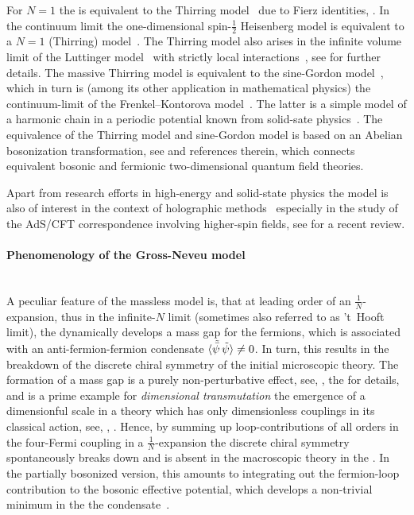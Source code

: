 For $N=1$ the \gnm{} is equivalent to the Thirring model~\cite{Thirring:1958in,Witten:1978qu} due to Fierz identities, \cf{} .
In the continuum limit the one-dimensional spin-$\tfrac{1}{2}$ Heisenberg model is equivalent to a $N = 1$ \gn{} (Thirring) model~\cite{Fradkin:2013}.
The Thirring model also arises in the infinite volume limit of the Luttinger model~\cite{Luttinger:1963zz} with strictly local interactions~\cite{Heidenreich:1980}, see  for further details.
The massive Thirring model is equivalent to the sine-Gordon model~\cite{Coleman:1974bu,Delepine:1997bz}, which in turn is (among its other application in mathematical physics) the continuum-limit of the Frenkel–Kontorova model~\cite{Frenkel:431595}.
The latter is a simple model of a harmonic chain in a periodic potential known from solid-sate physics~\cite{Kivshar:2000}.
The equivalence of the Thirring model and sine-Gordon model is based on an Abelian bosonization transformation, see  and references therein, which connects equivalent bosonic and fermionic two-dimensional quantum field theories.

Apart from research efforts in high-energy and solid-state physics the \gn{} model is also of interest in the context of holographic methods~\cite{Maldacena:1997re,Witten:1998qj} especially in the study of the AdS/CFT correspondence involving higher-spin fields, see  for a recent review.

\paragraph{Phenomenology of the Gross-Neveu model}\label{paragraph:GN_pheno}\mbox{}\\%
A peculiar feature of the massless \gn{} model is, that at leading order of an $\tfrac{1}{N}$-expansion, thus in the infinite-$N$ limit (sometimes also referred to as 't~Hooft limit), the \gnm{} dynamically develops a mass gap for the fermions, which is associated with an anti-fermion-fermion condensate $\langle \tilde{\bar{\psi}} \, \tilde{\psi} \rangle \neq 0$.
In turn, this results in the breakdown of the discrete chiral symmetry of the initial microscopic \uv{} theory.
The formation of a mass gap is a purely non-perturbative effect, see, \eg{}, the  for details, and is a prime example for \textit{dimensional transmutation} \dash{} the emergence of a dimensionful scale in a theory which has only dimensionless couplings in its \uv{} classical action, see, \eg{}, .
Hence, by summing up loop-contributions of all orders in the four-Fermi coupling in a $\tfrac{1}{N}$-expansion the discrete chiral symmetry spontaneously breaks down and is absent in the macroscopic theory in the \ir{}.
In the partially bosonized version, this amounts to integrating out the fermion-loop contribution to the bosonic effective potential, which develops a non-trivial minimum in the \ir{} \dash{} the condensate~\cite{ZinnJustin:1991yn,ZinnJustin:2002ru,Rosenstein:1990nm,Luperini:1991sv,Quinto:2021lqn}.

